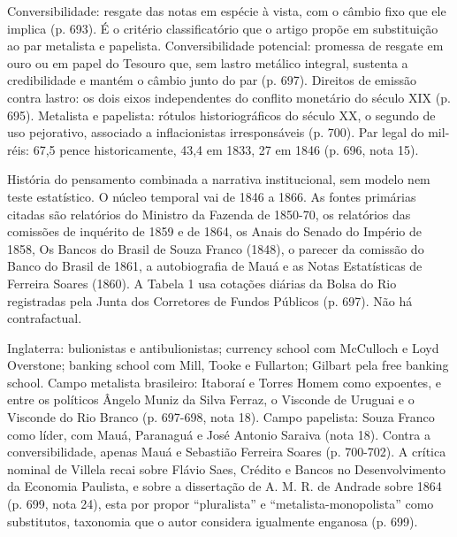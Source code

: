 Conversibilidade: resgate das notas em espécie à vista, com o câmbio fixo que ele
implica (p. 693). É o critério classificatório que o artigo propõe em
substituição ao par metalista e papelista. Conversibilidade potencial: promessa
de resgate em ouro ou em papel do Tesouro que, sem lastro metálico integral,
sustenta a credibilidade e mantém o câmbio junto do par (p. 697). Direitos de
emissão contra lastro: os dois eixos independentes do conflito monetário do
século XIX (p. 695). Metalista e papelista: rótulos historiográficos do século
XX, o segundo de uso pejorativo, associado a inflacionistas irresponsáveis
(p. 700). Par legal do mil-réis: 67,5 pence historicamente, 43,4 em 1833, 27 em
1846 (p. 696, nota 15).

História do pensamento combinada a narrativa institucional, sem modelo nem teste
estatístico. O núcleo temporal vai de 1846 a 1866. As fontes primárias citadas
são relatórios do Ministro da Fazenda de 1850-70, os relatórios das comissões de
inquérito de 1859 e de 1864, os Anais do Senado do Império de 1858, Os Bancos do
Brasil de Souza Franco (1848), o parecer da comissão do Banco do Brasil de 1861,
a autobiografia de Mauá e as Notas Estatísticas de Ferreira Soares (1860). A
Tabela 1 usa cotações diárias da Bolsa do Rio registradas pela Junta dos
Corretores de Fundos Públicos (p. 697). Não há contrafactual.

Inglaterra: bulionistas e antibulionistas; currency school com McCulloch e Loyd
Overstone; banking school com Mill, Tooke e Fullarton; Gilbart pela free banking
school. Campo metalista brasileiro: Itaboraí e Torres Homem como expoentes, e
entre os políticos Ângelo Muniz da Silva Ferraz, o Visconde de Uruguai e o
Visconde do Rio Branco (p. 697-698, nota 18). Campo papelista: Souza Franco como
líder, com Mauá, Paranaguá e José Antonio Saraiva (nota 18). Contra a
conversibilidade, apenas Mauá e Sebastião Ferreira Soares (p. 700-702). A crítica
nominal de Villela recai sobre Flávio Saes, Crédito e Bancos no Desenvolvimento
da Economia Paulista, e sobre a dissertação de A. M. R. de Andrade sobre 1864
(p. 699, nota 24), esta por propor ``pluralista'' e ``metalista-monopolista''
como substitutos, taxonomia que o autor considera igualmente enganosa (p. 699).

